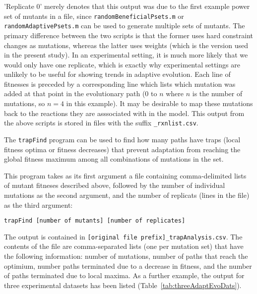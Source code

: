 'Replicate 0' merely denotes that this output was due to the first
example power set of mutants in a file, since
\texttt{randomBeneficialPsets.m} or \texttt{randomAdaptivePsets.m} can
be used to generate multiple sets of mutants. The primary difference
between the two scripts is that the former uses hard constraint
changes as mutations, whereas the latter uses weights (which is the
version used in the present study).  In an experimental setting,
it is much more likely that we would only have one replicate, which is
exactly why experimental settings are unlikely to be useful for
showing trends in adaptive evolution. Each line of fitnesses is
preceded by a corresponding line which lists which mutation was added
at that point in the evolutionary path (0 to $n$ where $n$ is the
number of mutations, so $n = 4$ in this example). It may be desirable 
to map these mutations back to the reactions they are asssociated with
in the model. This output from the above scripts is stored in files
with the suffix \texttt{\_rxnlist.csv}.

The \texttt{trapFind} program can be used to find how many paths have
traps (local fitness optima or fitness decreases) that prevent
adaptation from reaching the global fitness maximum among all
combinations of mutations in the set.

This program takes as its first argument a file containing comma-delimited 
lists of mutant fitneses described above, followed by the number of 
individual mutations as the second argument, and the number of replicats 
(lines in the file) as the third argument:

\vspace{1ex}
\noindent
\texttt{trapFind [number of mutants] [number of replicates]}
\label{trapFindCmd}
\vspace{1ex}
 
The output is contained in \texttt{[original file
prefix]\_trapAnalysis.csv}. The contents of the file are
comma-separated lists (one per mutation set) that have the following
information: number of mutations, number of paths that reach the
optimium, number paths terminated due to a decrease in fitness, and
the number of paths terminated due to local maxima. As a further
example, the output for three experimental datasets has been listed
(Table~\ref{tab:threeAdaptEvoDats}).


